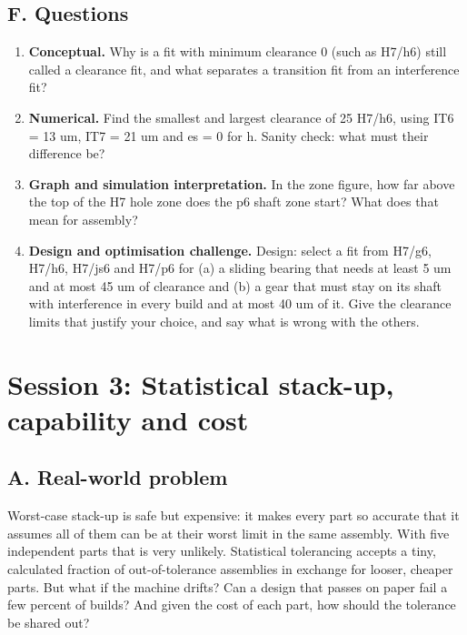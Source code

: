 \documentclass[11pt,a4paper]{article}
\begin{document}
\subsection*{F. Questions}
\begin{enumerate}[nosep]
\item \textbf{Conceptual.} Why is a fit with minimum clearance 0 (such as H7/h6) still called a clearance fit, and what separates a transition fit from an interference fit?
\item \textbf{Numerical.} Find the smallest and largest clearance of 25 H7/h6, using IT6 = 13 um, IT7 = 21 um and es = 0 for h. Sanity check: what must their difference be?
\item \textbf{Graph and simulation interpretation.} In the zone figure, how far above the top of the H7 hole zone does the p6 shaft zone start? What does that mean for assembly?
\item \textbf{Design and optimisation challenge.} Design: select a fit from H7/g6, H7/h6, H7/js6 and H7/p6 for (a) a sliding bearing that needs at least 5 um and at most 45 um of clearance and (b) a gear that must stay on its shaft with interference in every build and at most 40 um of it. Give the clearance limits that justify your choice, and say what is wrong with the others.
\end{enumerate}

\section{Session 3: Statistical stack-up, capability and cost}

\subsection*{A. Real-world problem}
Worst-case stack-up is safe but expensive: it makes every part so accurate that it assumes all of them can be at their worst limit in the same assembly. With five independent parts that is very unlikely. Statistical tolerancing accepts a tiny, calculated fraction of out-of-tolerance assemblies in exchange for looser, cheaper parts. But what if the machine drifts? Can a design that passes on paper fail a few percent of builds? And given the cost of each part, how should the tolerance be shared out?
\end{document}
